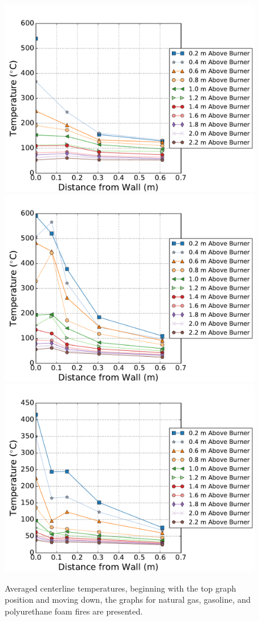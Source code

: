 \documentclass[twoside]{uocthesis}
\begin{document}
{\begin{figure}[p]
	\centering
	\includegraphics[width=.625\columnwidth]{../Figures/IWGB_NG_TC_Surface_Center_Avg}\\
	\includegraphics[width=.625\columnwidth]{../Figures/IWGB_GAS_TC_Surface_Center_Avg}\\
	\includegraphics[width=.625\columnwidth]{../Figures/IWGB_PUF_TC_Surface_Center_Avg}\\
	\caption[Averaged centerline temperature for the natural gas, gasoline, and foam fires]{Averaged centerline temperatures, beginning with the top graph position and moving down, the graphs for natural gas, gasoline, and polyurethane foam fires are presented.}
	\label{IWGB_Temp_Comp_FrontCenter}
\end{figure}


}
\end{document}
